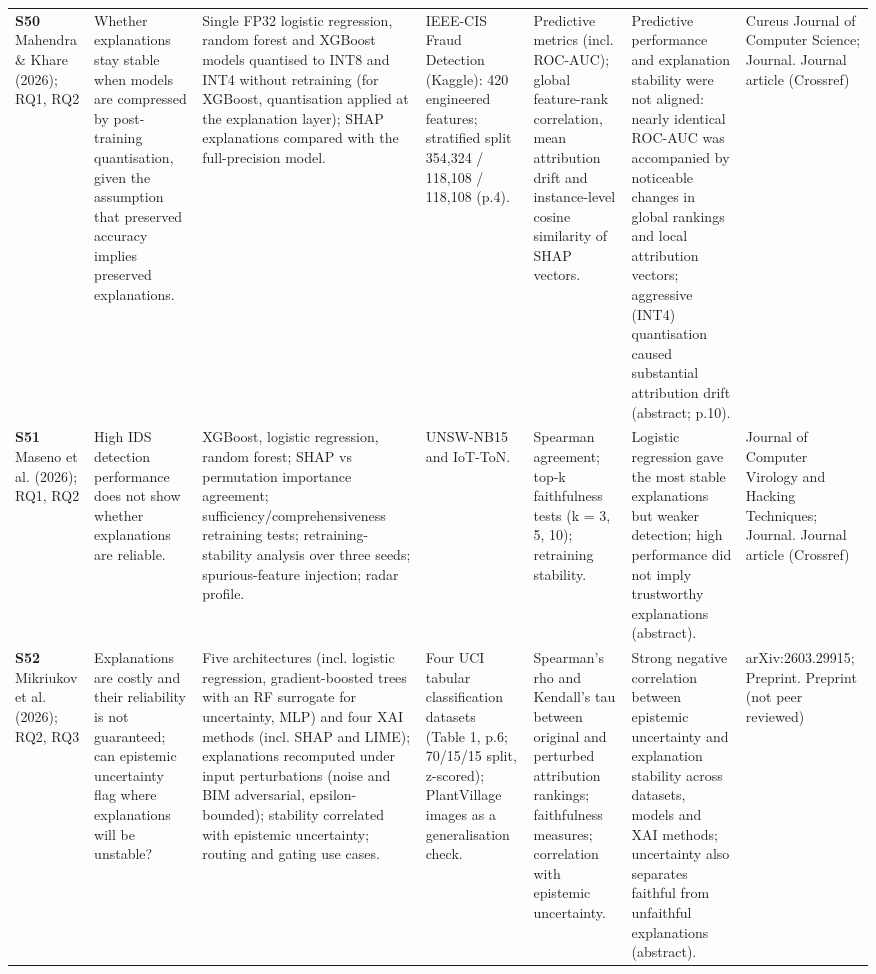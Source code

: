 \begin{longtable}{@{}P{1.55cm}P{2.9cm}P{4.5cm}P{3.2cm}P{3.4cm}P{4.6cm}P{3.6cm}@{}}
\textbf{S50} \cite{S50} Mahendra \& Khare (2026); RQ1, RQ2 & Whether explanations stay stable when models are compressed by post-training quantisation, given the assumption that preserved accuracy implies preserved explanations. & Single FP32 logistic regression, random forest and XGBoost models quantised to INT8 and INT4 without retraining (for XGBoost, quantisation applied at the explanation layer); SHAP explanations compared with the full-precision model. & IEEE-CIS Fraud Detection (Kaggle): 420 engineered features; stratified split 354,324 /\allowbreak{} 118,108 /\allowbreak{} 118,108 (p.4). & Predictive metrics (incl. ROC-AUC); global feature-rank correlation, mean attribution drift and instance-level cosine similarity of SHAP vectors. & Predictive performance and explanation stability were not aligned: nearly identical ROC-AUC was accompanied by noticeable changes in global rankings and local attribution vectors; aggressive (INT4) quantisation caused substantial attribution drift (abstract; p.10). & Cureus Journal of Computer Science; Journal. Journal article (Crossref) \\
\textbf{S51} \cite{S51} Maseno et al. (2026); RQ1, RQ2 & High IDS detection performance does not show whether explanations are reliable. & XGBoost, logistic regression, random forest; SHAP vs permutation importance agreement; sufficiency/\allowbreak{}comprehensiveness retraining tests; retraining-stability analysis over three seeds; spurious-feature injection; radar profile. & UNSW-NB15 and IoT-ToN. & Spearman agreement; top-k faithfulness tests (k = 3, 5, 10); retraining stability. & Logistic regression gave the most stable explanations but weaker detection; high performance did not imply trustworthy explanations (abstract). & Journal of Computer Virology and Hacking Techniques; Journal. Journal article (Crossref) \\
\textbf{S52} \cite{S52} Mikriukov et al. (2026); RQ2, RQ3 & Explanations are costly and their reliability is not guaranteed; can epistemic uncertainty flag where explanations will be unstable? & Five architectures (incl. logistic regression, gradient-boosted trees with an RF surrogate for uncertainty, MLP) and four XAI methods (incl. SHAP and LIME); explanations recomputed under input perturbations (noise and BIM adversarial, epsilon-bounded); stability correlated with epistemic uncertainty; routing and gating use cases. & Four UCI tabular classification datasets (Table 1, p.6; 70/\allowbreak{}15/\allowbreak{}15 split, z-scored); PlantVillage images as a generalisation check. & Spearman's rho and Kendall's tau between original and perturbed attribution rankings; faithfulness measures; correlation with epistemic uncertainty. & Strong negative correlation between epistemic uncertainty and explanation stability across datasets, models and XAI methods; uncertainty also separates faithful from unfaithful explanations (abstract). & arXiv:2603.29915; Preprint. Preprint (not peer reviewed) \\

\end{longtable}
